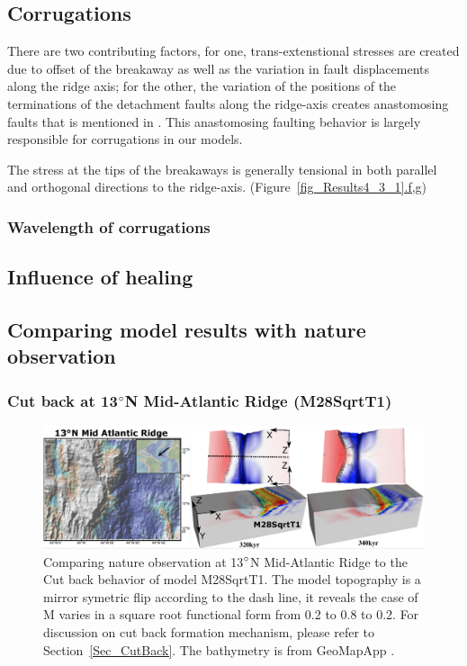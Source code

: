 \subsection{Corrugations}
There are two contributing factors, for one, trans-extenstional stresses are created due to offset of the breakaway as well as the variation in fault displacements along the ridge axis; for the other, the variation of the positions of the terminations of the detachment faults along the ridge-axis creates anastomosing faults that is mentioned in \citep{Smith2014}. This anastomosing faulting behavior is largely responsible for corrugations in our models.      

The stress at the tips of the breakaways is generally tensional in both parallel and orthogonal directions to the ridge-axis. (Figure~\hyperref[fig_Results4_3_1]{\ref{fig_Results4_3_1}.f,g})

\subsubsection{Wavelength of corrugations}

\subsection{Influence of healing}

\subsection{Comparing model results with nature observation}

\subsubsection{Cut back at 13$\degree$N Mid-Atlantic Ridge (M28SqrtT1)}

\begin{figure}[h]
 \centering
  \includegraphics[width=1.0\textwidth]{./Figures/fig_Discussion_Observation_1_13N_MAR_CutBack.eps}
 \caption{Comparing nature observation at 13$\degree$N Mid-Atlantic Ridge to the Cut back behavior of model M28SqrtT1. The model topography is a mirror symetric flip according to the dash line, it reveals the case of M varies in a square root functional form from 0.2 to 0.8 to 0.2. For discussion on cut back formation mechanism, please refer to Section~\hyperref[Sec_CutBack]{\ref{Sec_CutBack}}. The bathymetry is from GeoMapApp \citep{Ryan2009}.}
 \label{fig_Discussion_Observation_1}
\end{figure}

